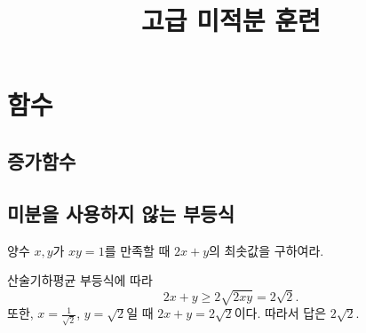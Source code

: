 \documentclass{../prb}
\title{고급 미적분 훈련}
\begin{document}
\maketitle
\tableofcontents


\chapter{함수}

\section{증가함수}

\section{미분을 사용하지 않는 부등식}

\begin{prb}
양수 $x,y$가 $xy=1$를 만족할 때 $2x+y$의 최솟값을 구하여라.
\end{prb}
\begin{sol}
산술기하평균 부등식에 따라
\[2x+y\ge2\sqrt{2xy}=2\sqrt2.\]
또한, $x=\frac1{\sqrt2}$, $y=\sqrt2$일 때 $2x+y=2\sqrt2$이다.
따라서 답은 $2\sqrt2$.
\end{sol}

\+
\end{document}

